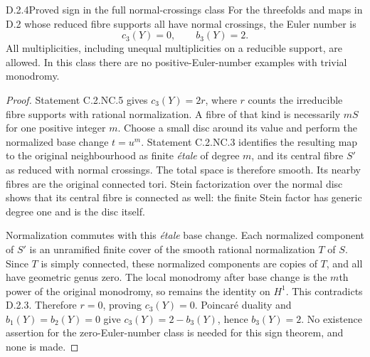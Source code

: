 \begin{idstatement}{D.2.4}{Proved sign in the full normal-crossings class}
\label{st:D.2.4}
For the threefolds and maps in D.2 whose reduced fibre supports
all have normal crossings, the Euler number is
\[
c_3(Y)=0,\qquad b_3(Y)=2.
\]
All multiplicities, including unequal multiplicities on a
reducible support, are allowed. In this class there are no
positive-Euler-number examples with trivial monodromy.
\end{idstatement}
\begin{proof}
Statement C.2.NC.5 gives $c_3(Y)=2r$, where $r$ counts the
irreducible fibre supports with rational normalization. A fibre
of that kind is necessarily $mS$ for one positive integer $m$.
Choose a small disc around its value and perform the normalized
base change $t=u^m$. Statement C.2.NC.3 identifies the resulting
map to the original neighbourhood as finite \emph{\'etale} of
degree $m$, and its central fibre $S'$ as reduced with normal
crossings. The total space is therefore smooth. Its nearby
fibres are the original connected tori. Stein factorization
over the normal disc shows that its central fibre is connected
as well: the finite Stein factor has generic degree one and is
the disc itself.

Normalization commutes with this \emph{\'etale} base change.
Each normalized component of $S'$ is an unramified finite cover
of the smooth rational normalization $T$ of $S$. Since $T$ is
simply connected, these normalized components are copies of
$T$, and all have geometric genus zero. The local monodromy
after base change is the $m$th power of the original monodromy,
so remains the identity on $H^1$. This contradicts D.2.3.
Therefore $r=0$, proving $c_3(Y)=0$. Poincar\'e duality and
$b_1(Y)=b_2(Y)=0$ give $c_3(Y)=2-b_3(Y)$, hence $b_3(Y)=2$.
No existence assertion for the zero-Euler-number class is
needed for this sign theorem, and none is made.
\end{proof}



